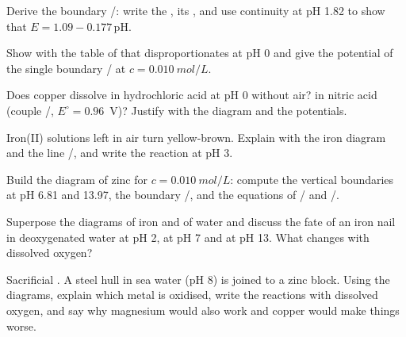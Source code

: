 \begin{exercise}[$\star\star$]\label{exo:b1:e-ph-diagrams:6}
Derive the boundary /: write the , its
, and use continuity at pH 1.82 to show that $E = 1.09 -
0.177\,\mathrm{pH}$.
\end{exercise}

\begin{exercise}[$\star\star$]\label{exo:b1:e-ph-diagrams:7}
Show with the table of  that  disproportionates
at pH 0 and give the potential of the single boundary /
at $c = \qty{0.010}{mol/L}$.
\end{exercise}

\begin{exercise}[$\star\star$]\label{exo:b1:e-ph-diagrams:8}
Does copper dissolve in hydrochloric acid at pH 0 without air? in nitric
acid (couple /, $E^\circ = 0.96$~V)? Justify with the
diagram and the potentials.
\end{exercise}

\begin{exercise}[$\star\star$]\label{exo:b1:e-ph-diagrams:9}
Iron(II) solutions left in air turn yellow-brown. Explain with the iron
diagram and the line /, and write the reaction at pH 3.
\end{exercise}

\begin{exercise}[$\star\star\star$]\label{exo:b1:e-ph-diagrams:10}
Build the diagram of zinc for $c = \qty{0.010}{mol/L}$: compute the
vertical boundaries at pH 6.81 and 13.97, the boundary /,
and the equations of / and /.
\end{exercise}

\begin{exercise}[$\star\star\star$]\label{exo:b1:e-ph-diagrams:11}
Superpose the diagrams of iron and of water and discuss the fate of an
iron nail in deoxygenated water at pH 2, at pH 7 and at pH 13. What
changes with dissolved oxygen?
\end{exercise}

\begin{exercise}[$\star\star\star$]\label{exo:b1:e-ph-diagrams:12}
Sacrificial . A steel hull in sea water (pH 8) is joined to a zinc
block. Using the diagrams, explain which metal is oxidised, write the
reactions with dissolved oxygen, and say why magnesium would also work
and copper would make things worse.
\end{exercise}

